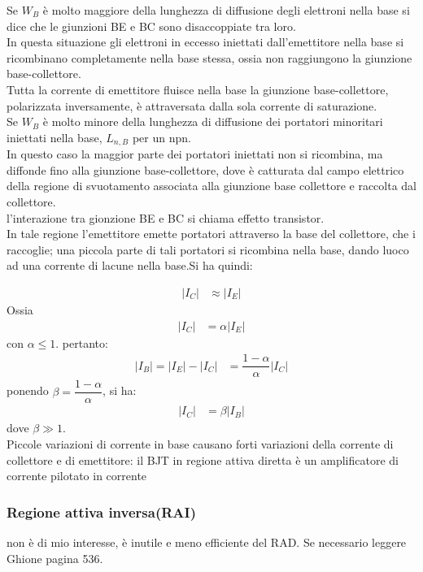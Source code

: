 Se $W_B$ è molto maggiore della lunghezza di diffusione degli elettroni nella base si dice che le giunzioni BE e BC sono disaccoppiate tra loro.\\
In questa situazione gli elettroni in eccesso iniettati dall'emettitore nella base si ricombinano completamente nella base stessa, ossia non raggiungono la giunzione base-collettore.\\
Tutta la corrente di emettitore fluisce nella base la giunzione base-collettore, polarizzata inversamente, è attraversata dalla sola corrente di saturazione.\\

Se $W_B$ è molto minore della lunghezza di diffusione dei portatori minoritari iniettati nella base, $L_{n,B}$ per un npn.\\
In questo caso la maggior parte dei portatori iniettati non si ricombina, ma diffonde fino alla giunzione base-collettore, dove è catturata dal campo elettrico della regione di svuotamento associata alla giunzione base collettore e raccolta dal collettore.\\
l'interazione tra gionzione BE e BC si chiama effetto transistor.\\
In tale regione l'emettitore emette portatori attraverso la base del collettore, che i raccoglie; una piccola parte di tali portatori si ricombina nella base, dando luoco ad una corrente di lacune nella base.Si ha quindi:

\begin{align}
    |I_C| &\approx |I_E|
\end{align}
Ossia
\begin{align}
    |I_C| &=\alpha|I_E|
\end{align}
con $\alpha \leq 1$. pertanto:
\begin{align}
    |I_B|= |I_E|-|I_C|&=\dfrac{1-\alpha}{\alpha}|I_C|
\end{align}
%
ponendo $\beta=\dfrac{1-\alpha}{\alpha}$, si ha:
\begin{align}
    |I_C| &=\beta|I_B|
\end{align}
dove $\beta \gg 1$.\\
Piccole variazioni di corrente in base causano forti variazioni della corrente di collettore e di emettitore: il BJT in regione attiva diretta è un amplificatore di corrente pilotato in corrente

\subsubsection{Regione attiva inversa(RAI)}
non è di mio interesse, è inutile e meno efficiente del RAD. Se necessario leggere Ghione pagina 536.
\cleardoublepage

